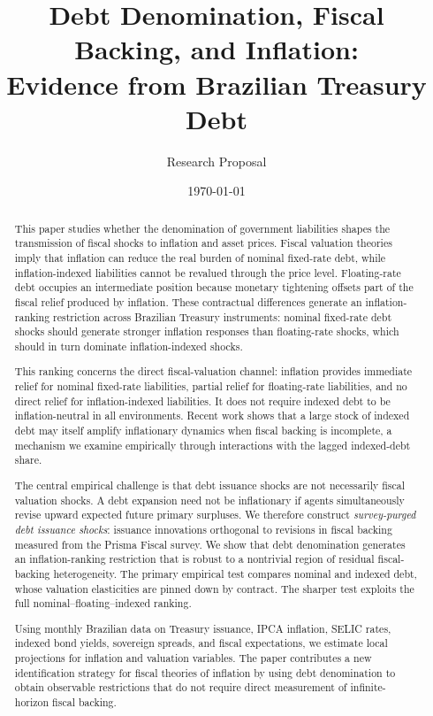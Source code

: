 \documentclass[12pt,a4paper]{article}
\title{\textbf{Debt Denomination, Fiscal Backing, and Inflation:\\ Evidence from Brazilian Treasury Debt}}
\author{Research Proposal}
\date{\today}
\begin{document}
\maketitle

\begin{abstract}
This paper studies whether the denomination of government liabilities shapes the transmission of fiscal shocks to inflation and asset prices. Fiscal valuation theories imply that inflation can reduce the real burden of nominal fixed-rate debt, while inflation-indexed liabilities cannot be revalued through the price level. Floating-rate debt occupies an intermediate position because monetary tightening offsets part of the fiscal relief produced by inflation. These contractual differences generate an inflation-ranking restriction across Brazilian Treasury instruments: nominal fixed-rate debt shocks should generate stronger inflation responses than floating-rate shocks, which should in turn dominate inflation-indexed shocks.

This ranking concerns the direct fiscal-valuation channel: inflation provides immediate relief for nominal fixed-rate liabilities, partial relief for floating-rate liabilities, and no direct relief for inflation-indexed liabilities. It does not require indexed debt to be inflation-neutral in all environments. Recent work shows that a large stock of indexed debt may itself amplify inflationary dynamics when fiscal backing is incomplete, a mechanism we examine empirically through interactions with the lagged indexed-debt share.

The central empirical challenge is that debt issuance shocks are not necessarily fiscal valuation shocks. A debt expansion need not be inflationary if agents simultaneously revise upward expected future primary surpluses. We therefore construct \emph{survey-purged debt issuance shocks}: issuance innovations orthogonal to revisions in fiscal backing measured from the Prisma Fiscal survey. We show that debt denomination generates an inflation-ranking restriction that is robust to a nontrivial region of residual fiscal-backing heterogeneity. The primary empirical test compares nominal and indexed debt, whose valuation elasticities are pinned down by contract. The sharper test exploits the full nominal--floating--indexed ranking.

Using monthly Brazilian data on Treasury issuance, IPCA inflation, SELIC rates, indexed bond yields, sovereign spreads, and fiscal expectations, we estimate local projections for inflation and valuation variables. The paper contributes a new identification strategy for fiscal theories of inflation by using debt denomination to obtain observable restrictions that do not require direct measurement of infinite-horizon fiscal backing.
\end{abstract}
\end{document}
